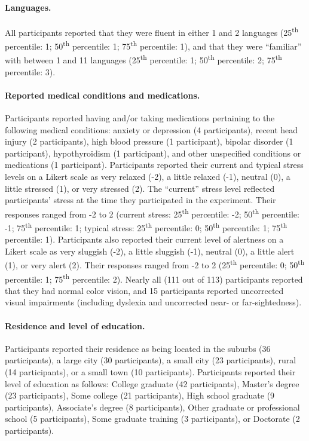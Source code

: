 \documentclass[10pt]{article}
\begin{document}
\paragraph{Languages.}
All participants reported that they were fluent in either 1 and 2
languages (25\textsuperscript{th} percentile: 1;
50\textsuperscript{th} percentile: 1; 75\textsuperscript{th}
percentile: 1), and that they were ``familiar'' with between 1 and 11
languages (25\textsuperscript{th} percentile: 1;
50\textsuperscript{th} percentile: 2; 75\textsuperscript{th}
percentile: 3).

\paragraph{Reported medical conditions and medications.}
Participants reported having and/or taking medications pertaining to the following medical conditions: anxiety or
depression (4 participants), recent head injury (2 participants), high
blood pressure (1 participant), bipolar disorder (1 participant),
hypothyroidism (1 participant), and other unspecified conditions or medications (1
participant).  Participants reported their current and typical stress
levels on a Likert scale as very relaxed (-2), a little relaxed (-1),
neutral (0), a little stressed (1), or very stressed (2).  The
``current'' stress level reflected participants' stress at the time
they participated in the experiment.
Their responses
ranged from -2 to 2 (current stress: 25\textsuperscript{th} percentile: -2;
50\textsuperscript{th} percentile: -1; 75\textsuperscript{th}
percentile: 1; typical stress: 25\textsuperscript{th} percentile: 0;
50\textsuperscript{th} percentile: 1; 75\textsuperscript{th}
percentile: 1).  Participants also reported their current level of
alertness on a Likert scale as very sluggish (-2), a little sluggish
(-1), neutral (0), a little alert (1), or very alert (2).  Their
responses ranged from -2 to 2 (25\textsuperscript{th} percentile: 0;
50\textsuperscript{th} percentile: 1; 75\textsuperscript{th}
percentile: 2).  Nearly all (111 out of 113) participants reported
that they had normal color vision, and 15 participants reported
uncorrected visual impairments (including dyslexia and uncorrected
near- or far-sightedness).

\paragraph{Residence and level of education.}
Participants reported their residence
as being located in the suburbs (36 participants), a large city (30
participants), a small city (23 participants), rural (14
participants), or a small town (10 participants).  Participants
reported their level of education as follows: College graduate (42
participants), Master's degree (23 participants), Some college (21
participants), High school graduate (9 participants), Associate's
degree (8 participants), Other graduate or professional school (5
participants), Some graduate training (3 participants), or Doctorate
(2 participants).
\end{document}
